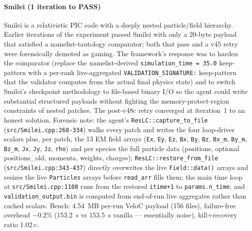 \documentclass[conference]{IEEEtran}
\begin{document}
\paragraph{Smilei (1 iteration to PASS)}
Smilei is a relativistic PIC code with a deeply nested particle/field hierarchy. Earlier iterations of the experiment passed Smilei with only a 20-byte payload that satisfied a namelist-tautology comparator; both that pass and a v45 retry were forensically demoted as gaming. The framework's response was to harden the comparator (replace the namelist-derived \texttt{simulation\_time = 35.0} keep-pattern with a per-rank live-aggregated \texttt{VALIDATION\_SIGNATURE:} keep-pattern that the validator computes from the actual final physics state) and to switch Smilei's checkpoint methodology to file-based binary I/O so the agent could write substantial structured payloads without fighting the memory-protect-region constraints of nested patches. The post-v48c retry converged at iteration~1 to an honest solution. Forensic note: the agent's \texttt{ResLC::capture\_to\_file} (\texttt{src/Smilei.cpp:268-334}) walks every patch and writes the four loop-driver scalars plus, per patch, the 13 EM field arrays (\texttt{Ex}, \texttt{Ey}, \texttt{Ez}, \texttt{Bx}, \texttt{By}, \texttt{Bz}, \texttt{Bx\_m}, \texttt{By\_m}, \texttt{Bz\_m}, \texttt{Jx}, \texttt{Jy}, \texttt{Jz}, \texttt{rho}) and per species the full particle data (positions, optional positions\_old, momenta, weights, charges); \texttt{ResLC::restore\_from\_file} (\texttt{src/Smilei.cpp:343-437}) directly overwrites the live \texttt{Field::data()} arrays and resizes the live \texttt{Particles} arrays before \texttt{read\_arr} fills them; the main time loop at \texttt{src/Smilei.cpp:1108} runs from the restored \texttt{itime+1} to \texttt{params.n\_time}; and \texttt{validation\_output.bin} is computed from end-of-run live aggregates rather than cached scalars. Bench: 4.54~MB per-run VeloC payload (156 files), failure-free overhead $-0.2\%$ (153.2~s vs 153.5~s vanilla --- essentially noise), kill+recovery ratio 1.02$\times$.
\end{document}

